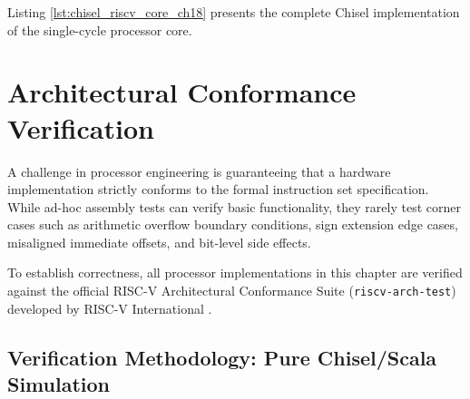 Listing \ref{lst:chisel_riscv_core_ch18} presents the complete Chisel implementation of the single-cycle processor core.



\section{Architectural Conformance Verification}\label{riscvConformance}

A challenge in processor engineering is guaranteeing that a hardware implementation strictly conforms to the formal instruction set specification. While ad-hoc assembly tests can verify basic functionality, they rarely test corner cases such as arithmetic overflow boundary conditions, sign extension edge cases, misaligned immediate offsets, and bit-level side effects.

To establish correctness, all processor implementations in this chapter are verified against the official RISC-V Architectural Conformance Suite (\texttt{riscv-arch-test}) developed by RISC-V International \cite{riscv-arch-test}.

\subsection{Verification Methodology: Pure Chisel/Scala Simulation}

